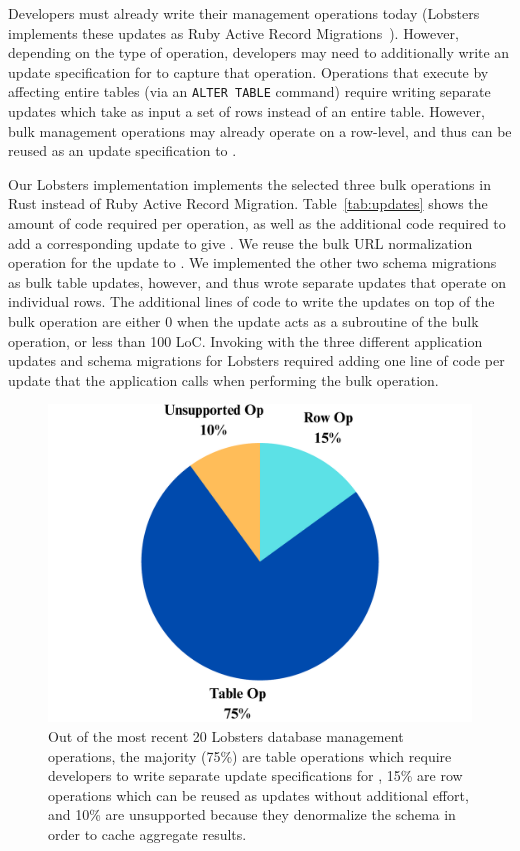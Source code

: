 Developers must already write their management operations today (\eg Lobsters
implements these updates as Ruby Active Record Migrations~\cite{ruby_arm}). 
%
However, depending on the type of operation, developers may need to additionally
write an update specification for \sys to capture that operation.
%
Operations that execute by affecting entire tables (\eg via an \texttt{ALTER
TABLE} command) require writing separate updates which take as input a set of
rows instead of an entire table.
%
However, bulk management operations may already operate on a row-level, and thus
can be reused as an update specification to \sys.


%
Our Lobsters implementation implements the selected three bulk operations in
Rust instead of Ruby Active Record Migration. Table~\ref{tab:updates} shows the
amount of code required per operation, as well as the additional code required
to add a corresponding update to give \sys. We reuse the bulk URL normalization
operation for the update to \sys. We implemented the other two schema migrations
as bulk table updates, however, and thus wrote separate updates that operate on
individual rows.
%
The additional lines of code to write the updates on top of the bulk operation
are either 0 when the update acts as a subroutine of the bulk operation, or
less than 100 LoC.
%
Invoking \sys with the three different application updates and schema migrations
for Lobsters required adding one line of code per update that the application
calls when performing the bulk operation. 
%

\begin{figure}
\centering
  \includegraphics[width=.7\columnwidth]{figs/categories}

    \caption{Out of the most recent 20 Lobsters database management operations,
    the majority (75\%) are table operations which require developers to write
    separate update specifications for \sys, 15\% are row operations which can
    be reused as updates without additional effort, and 10\% are unsupported
    because they denormalize the schema in order to cache aggregate results.}
  \label{tab:categories}
\end{figure}

